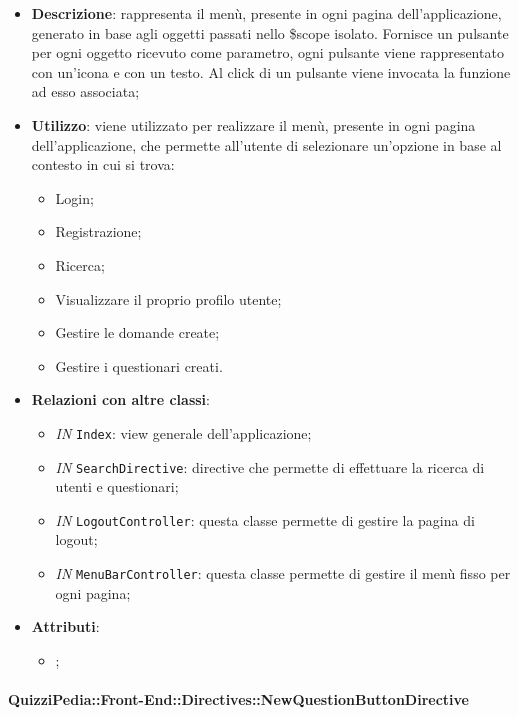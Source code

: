 \begin{itemize}
	\item \textbf{Descrizione}: rappresenta il menù, presente in ogni pagina dell'applicazione, generato in base agli oggetti passati nello \$scope isolato. Fornisce un pulsante per ogni oggetto ricevuto come parametro, ogni pulsante viene rappresentato con un’icona e con un testo. Al click di un pulsante viene invocata la funzione ad esso associata;
	\item \textbf{Utilizzo}: viene utilizzato per realizzare il menù, presente in ogni pagina dell'applicazione, che permette all'utente di selezionare un'opzione in base al contesto in cui si trova:
		\begin{itemize}
			\item Login;
			\item Registrazione;
			\item Ricerca;
			\item Visualizzare il proprio profilo utente;
			\item Gestire le domande create;
			\item Gestire i questionari creati.
		\end{itemize}
	\item \textbf{Relazioni con altre classi}: 
	\begin{itemize}
		\item \textit{IN} \texttt{Index}: view generale dell'applicazione;
		\item \textit{IN} \texttt{SearchDirective}: directive che permette di effettuare la ricerca di utenti e questionari;
		\item \textit{IN} \texttt{LogoutController}: questa classe permette di gestire la pagina di logout;
		\item \textit{IN} \texttt{MenuBarController}: questa classe permette di gestire il menù fisso per ogni pagina;
	\end{itemize}
	\item \textbf{Attributi}: 
	\begin{itemize}
		\item ;
	\end{itemize}
\end{itemize}

\paragraph{QuizziPedia::Front-End::Directives::NewQuestionButtonDirective}

\label{QuizziPedia::Front-End::Directives::NewQuestionButtonDirective}

